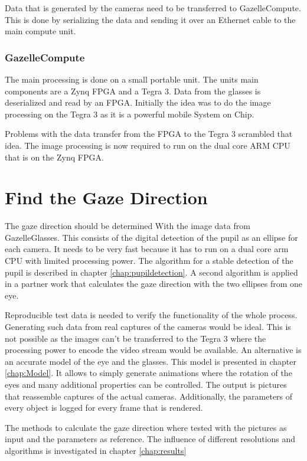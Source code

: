 Data that is generated by the cameras need to be transferred to GazelleCompute. This is done by serializing the data and sending it over an Ethernet cable to the main compute unit.\cite{retoDamian}
\subsubsection{GazelleCompute}
The main processing is done on a small portable unit. The units main components are a Zynq \gls{FPGA} and a Tegra 3. Data from the glasses is deserialized and read by an \gls{FPGA}. Initially the idea was to do the image processing on the Tegra 3 as it is a powerful mobile System on Chip.

Problems with the data transfer from the \gls{FPGA} to the Tegra 3 scrambled that idea. The image processing is now required to run on the dual core \gls{ARM} \gls{CPU} that is on the Zynq \gls{FPGA}.\cite{retoDamian}

\section{Find the Gaze Direction}
The gaze direction should be determined With the image data from GazelleGlasses. This consists of the digital detection of the pupil as an ellipse for each camera. It needs to be very fast because it has to run on a dual core arm \gls{CPU} with limited processing power. The algorithm for a stable detection of the pupil is described in chapter \ref{chap:pupildetection}. A second algorithm is applied in a partner work that calculates the gaze direction with the two ellipses from one eye. 

Reproducible test data is needed to verify the functionality of the whole process. Generating such data from real captures of the cameras would be ideal. This is not possible as the images can't be transferred to the Tegra 3 where the processing power to encode the video stream would be available. An alternative is an accurate model of the eye and the glasses. This model is presented in chapter \ref{chap:Model}. It allows to simply generate animations where the rotation of the eyes and many additional properties can be controlled. The output is pictures that reassemble captures of the actual cameras. Additionally, the parameters of every object is logged for every frame that is rendered.

The methods to calculate the gaze direction where tested with the pictures as input and the parameters as reference. The influence of different resolutions and algorithms is investigated in chapter \ref{chap:results}


